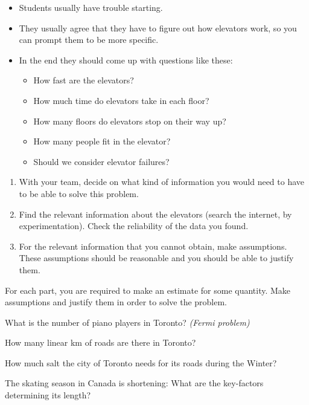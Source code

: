 \begin{annotation}
	\begin{notes}
		\begin{itemize}
			\item Students usually have trouble starting. 
			\item They usually agree that they have to figure out how elevators work, so you can prompt them to be more specific. 
			
			\item In the end they should come up with questions like these:
			\begin{itemize}
				\item How fast are the elevators?
				\item How much time do elevators take in each floor?
				\item How many floors do elevators stop on their way up?
				\item How many people fit in the elevator?
				\item Should we consider elevator failures?
			\end{itemize}
		\end{itemize}	
	\end{notes}
\end{annotation}

\begin{enumerate} 

	\item With your team, decide on what kind of information you would need to have to be able to solve this problem.

	\item Find the relevant information about the elevators (search the internet, by experimentation). Check the reliability of the data you found.

	\item For the relevant information that you cannot obtain, make assumptions. These assumptions should be reasonable and you should be able to justify them.
\end{enumerate}


\newpage



\question
For each part, you are required to make an estimate for some quantity. Make assumptions and justify them in order to solve the problem.
\begin{parts}
	\item What is the number of piano players in Toronto? \hfill \emph{(Fermi problem)}
	\item How many linear km of roads are there in Toronto?
	\item How much salt the city of Toronto needs for its roads during the Winter?
	\item The skating season in Canada is shortening: What are the key-factors determining its length?
	
\end{parts}












